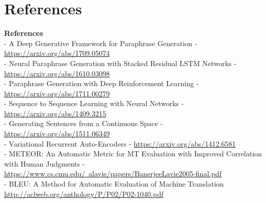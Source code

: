 \documentclass[10pt]{beamer}
\begin{document}
\section{References}
\textbf{References} \\
- A Deep Generative Framework for Paraphrase Generation - \href{https://arxiv.org/abs/1709.05074}{https://arxiv.org/abs/1709.05074} \\
- Neural Paraphrase Generation with Stacked Residual LSTM Networks - \href{https://arxiv.org/abs/1610.03098}{https://arxiv.org/abs/1610.03098} \\
- Paraphrase Generation with Deep Reinforcement Learning - \href{https://arxiv.org/abs/1711.00279}{https://arxiv.org/abs/1711.00279} \\
- Sequence to Sequence Learning with Neural Networks - 
 \href{https://arxiv.org/abs/1409.3215}{https://arxiv.org/abs/1409.3215} \\
- Generating Sentences from a Continuous Space - 
 \href{https://arxiv.org/abs/1511.06349}{https://arxiv.org/abs/1511.06349} \\
- Variational Recurrent Auto-Encoders
 - \href{https://arxiv.org/abs/1412.6581}{https://arxiv.org/abs/1412.6581} \\
- METEOR: An Automatic Metric for MT Evaluation with
Improved Correlation with Human Judgments - \href{https://www.cs.cmu.edu/~alavie/papers/BanerjeeLavie2005-final.pdf}{https://www.cs.cmu.edu/~alavie/papers/BanerjeeLavie2005-final.pdf} \\
- BLEU: A Method for Automatic Evaluation of Machine Translation \href{http://aclweb.org/anthology/P/P02/P02-1040.pdf}{http://aclweb.org/anthology/P/P02/P02-1040.pdf}

{\1
\begin{frame}
\end{frame}}
\end{document}
